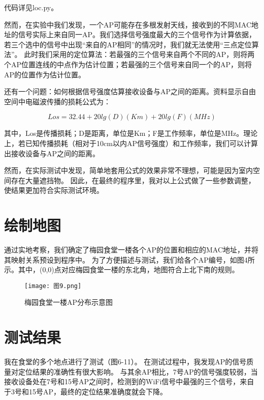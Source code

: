\documentclass{article}
\begin{document}
代码详见loc.py。

然而，在实验中我们发现，一个AP可能存在多根发射天线，接收到的不同MAC地址的信号实际上来自同一AP。我们选择信号强度最大的三个信号作为计算依据，若三个选中的信号中出现“来自的AP相同”的情况时，我们就无法使用“三点定位算法”。
此时我们采用的定位算法：若最强的三个信号来自两个不同的AP，则将两个AP位置连线的中点作为估计位置；若最强的三个信号来自同一个的AP，则将AP的位置作为估计位置。

还有一个问题：如何根据信号强度估算接收设备与AP之间的距离。资料显示自由空间中电磁波传播的损耗公式为：

\begin{equation}\label{t}
	Los = 32.44 + 20lg(D)(Km) + 20lg(F)(MHz)
\end{equation}

其中，Los是传播损耗；D是距离，单位是Km；F是工作频率，单位是MHz。理论上，若已知传播损耗（相对于10cm以内AP信号强度）和工作频率，我们可以计算出接收设备与AP之间的距离。

然而，在实际测试中发现，简单地套用公式的效果非常不理想，可能是因为室内空间存在大量遮挡物。
因此，在最终的程序里，我对以上公式做了一些参数调整，使结果更加符合实际测试环境。

\section{绘制地图}

通过实地考察，我们确定了梅园食堂一楼各个AP的位置和相应的MAC地址，并将其映射关系预设到程序中。
为了方便描述与测试，我们给各个AP编号，如图4所示。其中，(0,0)点对应梅园食堂一楼的东北角，地图符合上北下南的规则。

\begin{figure}[ht] %
    
    \centering
    
    \texttt{[image: 图9.png]}
        
    \caption{梅园食堂一楼AP分布示意图}
        
    \label{fig:i}
        
\end{figure}

\section{测试结果}

我在食堂的多个地点进行了测试（图6-11）。
在测试过程中，我发现AP的信号质量对定位结果的准确性有很大影响。
与其余AP相比，7号AP的信号强度较弱，当接收设备处在7号和15号AP之间时，检测到的WiFi信号中最强的三个信号，来自于3号和15号AP，最终的定位结果准确度就会下降。
\end{document}

